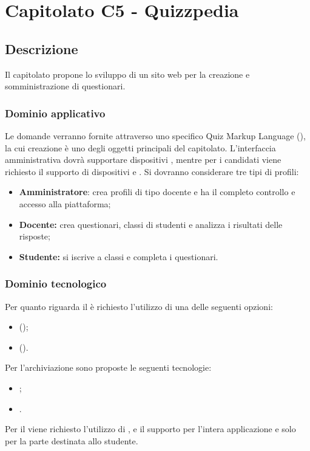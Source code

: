 \documentclass[12pt,a4paper]{article}
\begin{document}
\newpage
\section{Capitolato C5 - Quizzpedia}
\subsection{Descrizione}

Il capitolato propone lo sviluppo di un sito web per la creazione e somministrazione di questionari.

\subsubsection{Dominio applicativo}

Le domande verranno fornite attraverso uno specifico Quiz Markup Language (), la cui creazione è uno degli oggetti principali del capitolato. L'interfaccia amministrativa dovrà supportare dispositivi , mentre per i candidati viene richiesto il supporto di dispositivi  e . Si dovranno considerare tre tipi di profili:

\begin{itemize}
\item \textbf{Amministratore}: crea profili di tipo docente e ha il completo controllo e accesso alla piattaforma;
\item \textbf{Docente:} crea questionari, classi di studenti e analizza i risultati delle risposte;
\item \textbf{Studente:} si iscrive a classi e completa i questionari.
\end{itemize}

\subsubsection{Dominio tecnologico}

Per quanto riguarda il  è richiesto l'utilizzo di una delle seguenti opzioni:

\begin{itemize}
\item {} ();
\item {} ().
\end{itemize}
Per l'archiviazione sono proposte le seguenti tecnologie:
\begin{itemize}
\item {};
\item {}.
\end{itemize}
Per il  viene richiesto l'utilizzo di ,  e il supporto  per l'intera applicazione e  solo per la parte destinata allo studente.
\end{document}
